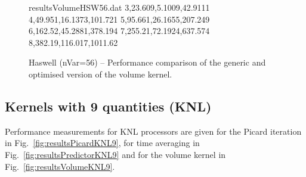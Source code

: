 \documentclass{acm_proc_article-sp}
\begin{document}
\begin{figure}[H]
\begin{filecontents}{resultsVolumeHSW56.dat}
3,23.609,5.1009,42.9111
4,49.951,16.1373,101.721
5,95.661,26.1655,207.249
6,162.52,45.2881,378.194
7,255.21,72.1924,637.574
8,382.19,116.017,1011.62
\end{filecontents}
\caption{Haswell (nVar=56) -- Performance comparison of the generic and optimised version of the volume kernel.}\label{fig:resultsVolumeHSW56}
\end{figure}

\subsection{Kernels with 9 quantities (KNL)} \label{sec:app2}

Performance measurements for KNL processors are given for the Picard iteration in Fig.~\ref{fig:resultsPicardKNL9}, for time averaging in Fig.~\ref{fig:resultsPredictorKNL9} and for the volume kernel in Fig.~\ref{fig:resultsVolumeKNL9}.
\end{document}
